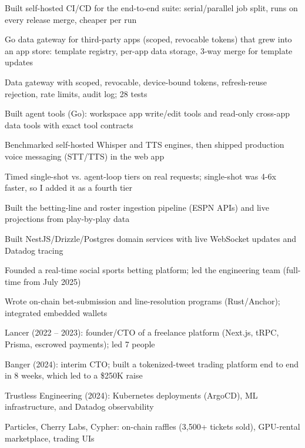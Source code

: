 \documentclass[print]{jack-resume}
\begin{document}
\begin{tightemize}
    \item Built self-hosted CI/CD for the end-to-end suite: serial/parallel job split, runs on every release merge, cheaper per run
    \item Go data gateway for third-party apps (scoped, revocable tokens) that grew into an app store: template registry, per-app data storage, 3-way merge for template updates
    \item Data gateway with scoped, revocable, device-bound tokens, refresh-reuse rejection, rate limits, audit log; 28 tests
    \item Built agent tools (Go): workspace app write/edit tools and read-only cross-app data tools with exact tool contracts
    \item Benchmarked self-hosted Whisper and TTS engines, then shipped production voice messaging (STT/TTS) in the web app
    \item Timed single-shot vs. agent-loop tiers on real requests; single-shot was 4-6x faster, so I added it as a fourth tier
\end{tightemize}
\sectionsep

\begin{tightemize}
    \item Built the betting-line and roster ingestion pipeline (ESPN APIs) and live projections from play-by-play data
    \item Built NestJS/Drizzle/Postgres domain services with live WebSocket updates and Datadog tracing
    \item Founded a real-time social sports betting platform; led the engineering team (full-time from July 2025)
    \item Wrote on-chain bet-submission and line-resolution programs (Rust/Anchor); integrated embedded wallets
\end{tightemize}
\sectionsep

\begin{tightemize}
    \item Lancer (2022 – 2023): founder/CTO of a freelance platform (Next.js, tRPC, Prisma, escrowed payments); led 7 people
    \item Banger (2024): interim CTO; built a tokenized-tweet trading platform end to end in 8 weeks, which led to a \$250K raise
    \item Trustless Engineering (2024): Kubernetes deployments (ArgoCD), ML infrastructure, and Datadog observability
    \item Particles, Cherry Labs, Cypher: on-chain raffles (3,500+ tickets sold), GPU-rental marketplace, trading UIs
\end{tightemize}
\sectionsep
\end{document}
